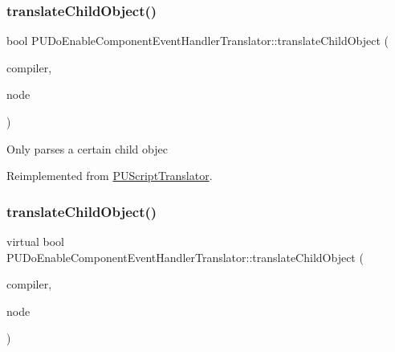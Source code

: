 \subsubsection{\texorpdfstring{translate\+Child\+Object()}{translateChildObject()}\hspace{0.1cm}{\footnotesize\ttfamily [1/2]}}
{\footnotesize\ttfamily bool P\+U\+Do\+Enable\+Component\+Event\+Handler\+Translator\+::translate\+Child\+Object (\begin{DoxyParamCaption}\item[{\hyperlink{classPUScriptCompiler}{P\+U\+Script\+Compiler} $\ast$}]{compiler,  }\item[{\hyperlink{classPUAbstractNode}{P\+U\+Abstract\+Node} $\ast$}]{node }\end{DoxyParamCaption})\hspace{0.3cm}{\ttfamily [virtual]}}

Only parses a certain child objec 

Reimplemented from \hyperlink{classPUScriptTranslator_ab587d01348ae3e678cb700c719b2b113}{P\+U\+Script\+Translator}.

\mbox{\label{classPUDoEnableComponentEventHandlerTranslator_aca6d3321364db91476174588f66ab235}} 
\subsubsection{\texorpdfstring{translate\+Child\+Object()}{translateChildObject()}\hspace{0.1cm}{\footnotesize\ttfamily [2/2]}}
{\footnotesize\ttfamily virtual bool P\+U\+Do\+Enable\+Component\+Event\+Handler\+Translator\+::translate\+Child\+Object (\begin{DoxyParamCaption}\item[{\hyperlink{classPUScriptCompiler}{P\+U\+Script\+Compiler} $\ast$}]{compiler,  }\item[{\hyperlink{classPUAbstractNode}{P\+U\+Abstract\+Node} $\ast$}]{node }\end{DoxyParamCaption})\hspace{0.3cm}{\ttfamily [virtual]}}

